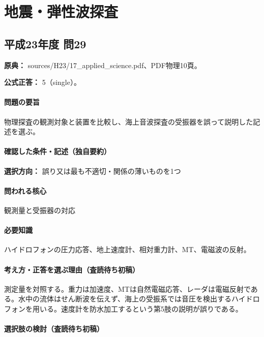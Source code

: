 \section{地震・弾性波探査}

\subsection{平成23年度 問29}
\label{q:h23-reg-applied-29}

\noindent\textbf{原典：} sources/H23/17\_applied\_science.pdf、PDF物理10頁。

\textbf{公式正答：} 5（single）。

\paragraph{問題の要旨} 物理探査の観測対象と装置を比較し、海上音波探査の受振器を誤って説明した記述を選ぶ。

\paragraph{確認した条件・記述（独自要約）}\mbox{}\par

\noindent\textbf{選択方向：} 誤り又は最も不適切・関係の薄いものを1つ\par

\paragraph{問われる核心} 観測量と受振器の対応

\paragraph{必要知識} ハイドロフォンの圧力応答、地上速度計、相対重力計、MT、電磁波の反射。

\paragraph{考え方・正答を選ぶ理由（査読待ち初稿）} 測定量を対照する。重力は加速度、MTは自然電磁応答、レーダは電磁反射である。水中の流体はせん断波を伝えず、海上の受振系では音圧を検出するハイドロフォンを用いる。速度計を防水加工するという第5肢の説明が誤りである。

\paragraph{選択肢の検討（査読待ち初稿）}\mbox{}\par

